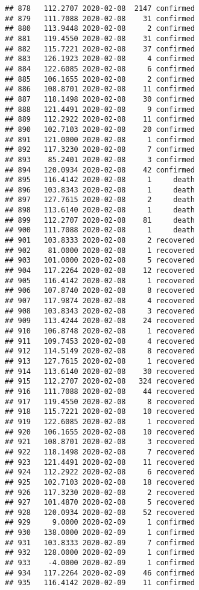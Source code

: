 \documentclass[
]{article}
\begin{document}
\begin{verbatim}
## 878   112.2707 2020-02-08  2147 confirmed
## 879   111.7088 2020-02-08    31 confirmed
## 880   113.9448 2020-02-08     2 confirmed
## 881   119.4550 2020-02-08    31 confirmed
## 882   115.7221 2020-02-08    37 confirmed
## 883   126.1923 2020-02-08     4 confirmed
## 884   122.6085 2020-02-08     6 confirmed
## 885   106.1655 2020-02-08     2 confirmed
## 886   108.8701 2020-02-08    11 confirmed
## 887   118.1498 2020-02-08    30 confirmed
## 888   121.4491 2020-02-08     9 confirmed
## 889   112.2922 2020-02-08    11 confirmed
## 890   102.7103 2020-02-08    20 confirmed
## 891   121.0000 2020-02-08     1 confirmed
## 892   117.3230 2020-02-08     7 confirmed
## 893    85.2401 2020-02-08     3 confirmed
## 894   120.0934 2020-02-08    42 confirmed
## 895   116.4142 2020-02-08     1     death
## 896   103.8343 2020-02-08     1     death
## 897   127.7615 2020-02-08     2     death
## 898   113.6140 2020-02-08     1     death
## 899   112.2707 2020-02-08    81     death
## 900   111.7088 2020-02-08     1     death
## 901   103.8333 2020-02-08     2 recovered
## 902    81.0000 2020-02-08     1 recovered
## 903   101.0000 2020-02-08     5 recovered
## 904   117.2264 2020-02-08    12 recovered
## 905   116.4142 2020-02-08     1 recovered
## 906   107.8740 2020-02-08     8 recovered
## 907   117.9874 2020-02-08     4 recovered
## 908   103.8343 2020-02-08     3 recovered
## 909   113.4244 2020-02-08    24 recovered
## 910   106.8748 2020-02-08     1 recovered
## 911   109.7453 2020-02-08     4 recovered
## 912   114.5149 2020-02-08     8 recovered
## 913   127.7615 2020-02-08     1 recovered
## 914   113.6140 2020-02-08    30 recovered
## 915   112.2707 2020-02-08   324 recovered
## 916   111.7088 2020-02-08    44 recovered
## 917   119.4550 2020-02-08     8 recovered
## 918   115.7221 2020-02-08    10 recovered
## 919   122.6085 2020-02-08     1 recovered
## 920   106.1655 2020-02-08    10 recovered
## 921   108.8701 2020-02-08     3 recovered
## 922   118.1498 2020-02-08     7 recovered
## 923   121.4491 2020-02-08    11 recovered
## 924   112.2922 2020-02-08     6 recovered
## 925   102.7103 2020-02-08    18 recovered
## 926   117.3230 2020-02-08     2 recovered
## 927   101.4870 2020-02-08     5 recovered
## 928   120.0934 2020-02-08    52 recovered
## 929     9.0000 2020-02-09     1 confirmed
## 930   138.0000 2020-02-09     1 confirmed
## 931   103.8333 2020-02-09     7 confirmed
## 932   128.0000 2020-02-09     1 confirmed
## 933    -4.0000 2020-02-09     1 confirmed
## 934   117.2264 2020-02-09    46 confirmed
## 935   116.4142 2020-02-09    11 confirmed

\end{verbatim}
\end{document}
